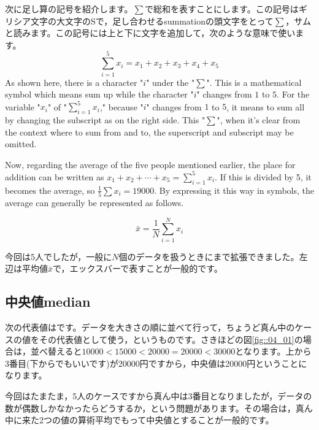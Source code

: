 \documentclass{ltjbook}
\begin{document}
次に足し算の記号を紹介します。$\sum$で総和を表すことにします。この記号はギリシア文字の大文字のSで，足し合わせるsummationの頭文字をとって$\sum$，サムと読みます。この記号には上と下に文字を追加して，次のような意味で使います。
\[ \sum_{i=1}^5 x_i= x_1 + x_2 + x_3 + x_4 + x_5  \]
As shown here, there is a character "$i$" under the "$\sum$". This is a mathematical symbol which means sum up while the character "$i$" changes from $1$ to $5$. For the variable "$x_i$" of "$\sum_{i=1}^5 x_i$," because "$i$" changes from $1$ to $5$, it means to sum all by changing the subscript as on the right side. This "$\sum$", when it's clear from the context where to sum from and to, the superscript and subscript may be omitted.

Now, regarding the average of the five people mentioned earlier, the place for addition can be written as $x_1+x_2+\cdots+x_5=\sum_{i=1}^5 x_i$. If this is divided by 5, it becomes the average, so $\frac{1}{5}\sum x_i = 19000$. By expressing it this way in symbols, the average can generally be represented as follows.

\[ \bar{x} = \frac{1}{N}\sum_{i=1}^N x_i \]

今回は5人でしたが，一般に$N$個のデータを扱うときにまで拡張できました。左辺は平均値$\bar{x}$で，エックスバーで表すことが一般的です。
\subsection{中央値median}
次の代表値はです。データを大きさの順に並べて行って，ちょうど真ん中のケースの値をその代表値として使う，というものです。さきほどの図\ref{fig::04_01}の場合は，並べ替えると$10000<15000<20000=20000<30000$となります。上から3番目(下からでもいいです)が20000円ですから，中央値は20000円ということになります。

今回はたまたま，5人のケースですから真ん中は3番目となりましたが，データの数が偶数しかなかったらどうするか，という問題があります。その場合は，真ん中に来た2つの値の算術平均でもって中央値とすることが一般的です。
\end{document}
